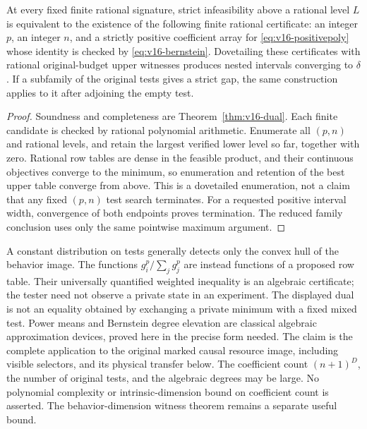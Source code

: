 \begin{corollary}
\label{cor:v16-algorithm}
At every fixed finite rational signature, strict infeasibility above a
rational level $L$ is equivalent to the existence of the following
finite rational certificate: an integer $p$, an integer $n$, and a
strictly positive coefficient array for \eqref{eq:v16-positivepoly}
whose identity is checked by \eqref{eq:v16-bernstein}. Dovetailing these
certificates with rational original-budget upper witnesses produces
nested intervals converging to $\delta$. If a subfamily of the original
tests gives a strict gap, the same construction applies to it after
adjoining the empty test.
\end{corollary}
\begin{proof}
Soundness and completeness are Theorem~\ref{thm:v16-dual}. Each finite
candidate is checked by rational polynomial arithmetic. Enumerate all
$(p,n)$ and rational levels, and retain the largest verified lower
level so far, together with zero. Rational row tables are dense in the
feasible product, and their continuous objectives converge to the
minimum, so enumeration and retention of the best upper table converge
from above. This is a dovetailed enumeration, not a claim that any
fixed $(p,n)$ test search terminates. For a requested positive interval
width, convergence of both endpoints proves termination. The reduced
family conclusion uses only the same pointwise maximum argument.
\end{proof}

\begin{remark}
A constant distribution on tests generally detects only the convex hull
of the behavior image. The functions $g_i^p/\sum_jg_j^p$ are instead
functions of a proposed row table. Their universally quantified weighted
inequality is an algebraic certificate; the tester need not observe a
private state in an experiment. The displayed dual is not an equality
obtained by exchanging a private minimum with a fixed mixed test.
Power means and Bernstein degree elevation are classical algebraic
approximation devices, proved here in the precise form needed. The
claim is the complete application to the original marked causal
resource image, including visible selectors, and its physical transfer
below. The coefficient count $(n+1)^D$, the number of original tests,
and the algebraic degrees may be large. No polynomial complexity or
intrinsic-dimension bound on coefficient count is asserted. The
behavior-dimension witness theorem remains a separate useful bound.
\end{remark}

